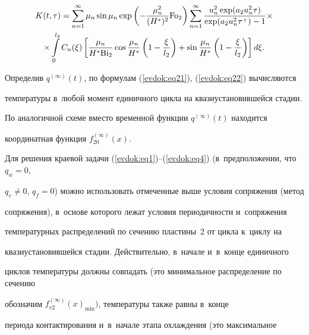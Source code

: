 \begin{multline*}

K(t,\tau ) = \sum\limits_{n = 1}^\infty {\mu _n \sin \mu _n \exp \left( { - 

\frac{\mu _n^2 }{(H^\ast )^2}{\rm Fo}_2 } \right)} \sum\limits_{n = 1}^\infty 

{\frac{u_n^2 \exp (a_2 u_n^2 \tau )}{\exp (a_2 u_n^2 \tau ^ + ) - 1}\times } 

\\

\times \int\limits_0^{l_2 } {C_n (\xi )\left[ {\frac{\mu _n }{H^\ast {\rm Bi}_2 

}\cos \frac{\mu _n }{H^\ast }\left( {1 - \frac{\xi }{l_2 }} \right) + \sin 

\frac{\mu _n }{H^\ast }\left( {1 - \frac{\xi }{l_2 }} \right)} \right]d\xi } 

.

\end{multline*}







Определив $q^{(\infty )}(t)$, по формулам (\ref{evdok:eq21}), (\ref{evdok:eq22}) вычисляются 

температуры в~любой момент единичного цикла на квазиустановившейся стадии. 

По аналогичной схеме вместо временной функции $q^{(\infty )}(t)$ находится 

координатная функция $f_{20}^{(\infty )} (x)$.



Для решения краевой задачи (\ref{evdok:eq1})--(\ref{evdok:eq4}) (в~предположении, что $q_w = 0$, 

$q_v \ne 0$, $q_f = 0$) можно использовать отмеченные выше условия сопряжения (метод 

сопряжения), в~основе которого лежат условия периодичности и~сопряжения 

температурных распределений по сечению пластины~2 от цикла к~циклу на 

квазиустановившейся стадии. Действительно, в~начале и~в~конце единичного 

циклов температуры должны совпадать (это минимальное распределение по сечению 

обозначим $f_{v2}^{(\infty )} (x)_{\min } )$, температуры также равны в~конце 

периода контактирования и~в~начале этапа охлаждения (это максимальное 

